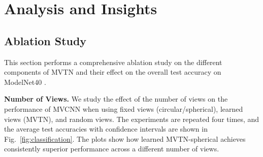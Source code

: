 \documentclass[10pt,twocolumn,letterpaper]{article}
\newcommand{\figLabel}{Fig.~}
\newcommand{\mysection}[1]{\noindent\textbf{#1.}}
\begin{document}
\begin{table}[t]

\tabcolsep=0.15cm
\centering
{}
\vspace{2pt}
\caption{\small\textbf{Occlusion Robustness of 3D Methods.} We report the test accuracy on point cloud ModelNet40 for different occlusion ratios of the data to measure occlusion robustness of different 3D methods. MVTN achieves 13\% better accuracy than PointNet (a robust network) when half of the object is occluded.}
\label{tbl:occlusion}
\end{table}




\section{Analysis and Insights} \label{sec:analysis}
\subsection{Ablation Study} \label{sec:ablation}
\vspace{-4pt}
This section performs a comprehensive ablation study on the different components of MVTN and their effect on the overall test accuracy on ModelNet40 \cite{modelnet}.

\mysection{Number of Views} \label{sec:views}
We study the effect of the number of views  on the performance of MVCNN when using fixed views (circular/spherical), learned views (MVTN), and random views.
The experiments are repeated four times, and the average test accuracies with confidence intervals are shown in  \figLabel{\ref{fig:classification}}. 
 The plots show how learned MVTN-spherical achieves consistently superior performance across a different number of views. 
\end{document}

